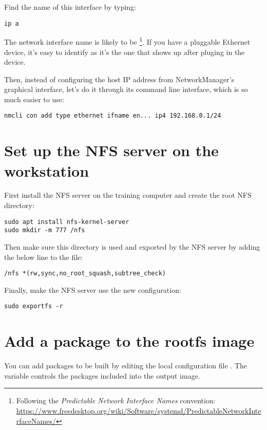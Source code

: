 Find the name of this interface by typing:
\begin{verbatim}
ip a
\end{verbatim}

The network interface name is likely to be
\footnote{Following the {\em Predictable Network Interface
Names} convention:
\url{https://www.freedesktop.org/wiki/Software/systemd/PredictableNetworkInterfaceNames/}}.
If you have a pluggable Ethernet device, it's easy to identify as it's
the one that shows up after pluging in the device.

Then, instead of configuring the host IP address from NetworkManager’s graphical interface,
let’s do it through its command line interface, which is so much easier to use:

\begin{verbatim}
nmcli con add type ethernet ifname en... ip4 192.168.0.1/24
\end{verbatim}

\section{Set up the NFS server on the workstation}

First install the NFS server on the training computer and create the root NFS
directory:
\begin{verbatim}
sudo apt install nfs-kernel-server
sudo mkdir -m 777 /nfs
\end{verbatim}

Then make sure this directory is used and exported by the NFS server by adding
the below line to the  file:

\begin{verbatim}
/nfs *(rw,sync,no_root_squash,subtree_check)
\end{verbatim}

Finally, make the NFS server use the new configuration:
\begin{verbatim}
sudo exportfs -r
\end{verbatim}

\section{Add a package to the rootfs image}

You can add packages to be built by editing the local configuration file
. The  variable controls the
packages included into the output image.


